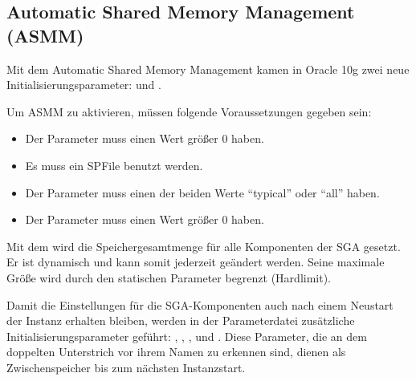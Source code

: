       \subsection{Automatic Shared Memory Management (ASMM)}
        Mit dem Automatic Shared Memory Management kamen in Oracle 10g zwei neue Initialisierungsparameter:  und .

        Um ASMM zu aktivieren, m\"ussen folgende Voraussetzungen gegeben sein:
        \begin{itemize}
          \item Der Parameter  muss einen Wert gr\"o\ss{}er 0 haben.
          \item Es muss ein SPFile benutzt werden.
          \item Der Parameter  muss einen der beiden Werte \enquote{typical} oder \enquote{all} haben.
          \item Der Parameter  muss einen Wert gr\"o\ss{}er 0 haben.
        \end{itemize}
        Mit dem  wird die Speichergesamtmenge f\"ur alle Komponenten der SGA gesetzt. Er ist dynamisch und kann somit jederzeit ge\"andert werden. Seine maximale Gr\"o\ss{}e wird durch den statischen Parameter  begrenzt (Hardlimit).

        Damit die Einstellungen f\"ur die SGA-Komponenten auch nach einem Neustart der Instanz erhalten bleiben, werden in der Parameterdatei zus\"atzliche Initialisierungsparameter gef\"uhrt: , , ,  und . Diese Parameter, die an dem doppelten Unterstrich vor ihrem Namen zu erkennen sind, dienen als Zwischenspeicher bis zum n\"achsten Instanzstart.

